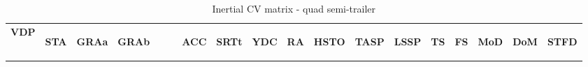 
\begin{table}[H]
\centering\scriptsize
\caption{Inertial CV matrix - quad semi-trailer}   
\label{table:cv-inertial-quad-semi}%
\begin{tabular}{|l|c|c|c|c|c|c|c|c|c|c|c|c|c|c|c|}

\hline
\multicolumn{1}{|c|}{\textbf{VDP}} & \begin{sideways}\textbf{STA}\end{sideways} & \begin{sideways}\textbf{GRAa}\end{sideways} & \begin{sideways}\textbf{GRAb~~~~}\end{sideways} & \begin{sideways}\textbf{ACC}\end{sideways} & \begin{sideways}\textbf{SRTt}\end{sideways} & \begin{sideways}\textbf{YDC}\end{sideways} & \begin{sideways}\textbf{RA}\end{sideways} & \begin{sideways}\textbf{HSTO}\end{sideways} & \begin{sideways}\textbf{TASP}\end{sideways} & \begin{sideways}\textbf{LSSP}\end{sideways} & \begin{sideways}\textbf{TS}\end{sideways} & \begin{sideways}\textbf{FS}\end{sideways} & \begin{sideways}\textbf{MoD}\end{sideways} & \begin{sideways}\textbf{DoM}\end{sideways} & \begin{sideways}\textbf{STFD}\end{sideways} \bigstrut\\


\end{tabular}
\end{table}
